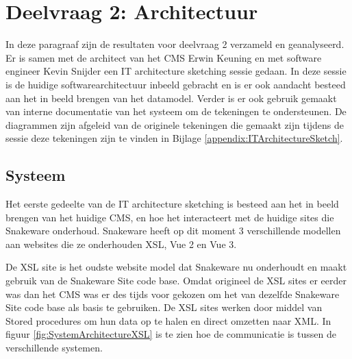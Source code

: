 \section{Deelvraag 2: Architectuur}
In deze paragraaf zijn de resultaten voor deelvraag 2 \qw{\textit{\SubquestionTwo}} verzameld en geanalyseerd.
Er is samen met de architect van het CMS Erwin Keuning en met software engineer Kevin Snijder een IT architecture sketching sessie gedaan.
In deze sessie is de huidige softwarearchitectuur inbeeld gebracht en is er ook aandacht besteed aan het in beeld brengen van het datamodel.
Verder is er ook gebruik gemaakt van interne documentatie van het systeem om de tekeningen te ondersteunen.
De diagrammen zijn afgeleid van de originele tekeningen die gemaakt zijn tijdens de sessie deze tekeningen zijn te vinden in Bijlage \ref{appendix:ITArchitectureSketch}.

\subsection{Systeem}
Het eerste gedeelte van de IT architecture sketching is besteed aan het in beeld brengen van het huidige CMS, en hoe het interacteert met de huidige sites die Snakeware onderhoud.
Snakeware heeft op dit moment 3 verschillende modellen aan websites die ze onderhouden \gls{XSL}, Vue 2 en Vue 3.

\whitespace
De \gls{XSL} site is het oudste website model dat Snakeware nu onderhoudt en maakt gebruik van de Snakeware Site code base.
Omdat origineel de \gls{XSL} sites er eerder was dan het \gls{CMS} was er des tijds voor gekozen om het van dezelfde Snakeware Site code base als basis te gebruiken.
De \gls{XSL} sites werken door middel van \gls{Stored procedures} om hun data op te halen en direct omzetten naar XML.
In figuur  \ref{fig:SystemArchitectureXSL} is te zien hoe de communicatie is tussen de verschillende systemen.
%
%

